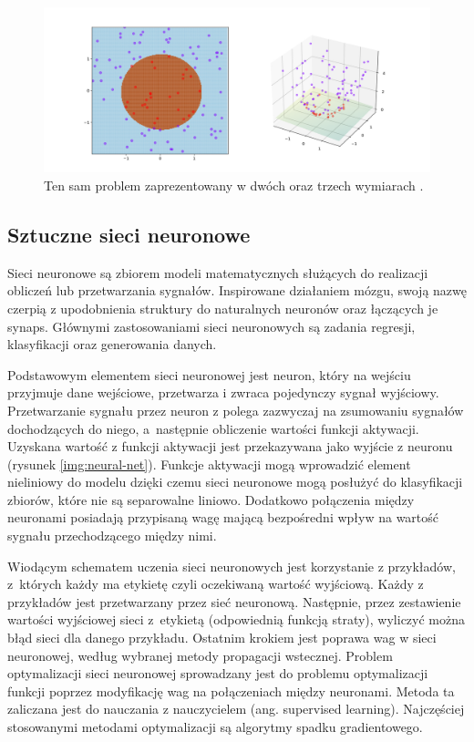 \documentclass[a4paper, twoside, 11pt, openright]{article}
\begin{document}
\begin{figure}[H]
\centering \includegraphics[scale=0.2]{img/svm2.png}
\caption{Ten sam problem zaprezentowany w dwóch oraz trzech wymiarach \cite{wikisvm}.}
\label{img:wiki_svm2}
\end{figure}


\subsection{Sztuczne sieci neuronowe}

Sieci neuronowe \cite{neural-nets} są zbiorem modeli matematycznych służących do realizacji obliczeń lub przetwarzania sygnałów. Inspirowane działaniem mózgu, swoją nazwę czerpią z upodobnienia struktury do naturalnych neuronów oraz łączących je synaps. Głównymi zastosowaniami sieci neuronowych są zadania regresji, klasyfikacji oraz generowania danych. 

\bigskip

Podstawowym elementem sieci neuronowej jest neuron, który na wejściu przyjmuje dane wejściowe, przetwarza i zwraca pojedynczy sygnał wyjściowy. Przetwarzanie sygnału przez neuron z polega zazwyczaj na zsumowaniu sygnałów dochodzących do niego, a~następnie obliczenie wartości funkcji aktywacji. Uzyskana wartość z funkcji aktywacji jest przekazywana jako wyjście z neuronu (rysunek \ref{img:neural-net}). Funkcje aktywacji mogą wprowadzić element nieliniowy do modelu dzięki czemu sieci neuronowe mogą posłużyć do klasyfikacji zbiorów, które nie są separowalne liniowo. Dodatkowo połączenia między neuronami posiadają przypisaną wagę mającą bezpośredni wpływ na wartość sygnału przechodzącego między nimi.

\bigskip

Wiodącym schematem uczenia sieci neuronowych jest korzystanie z przykładów, z~których każdy ma etykietę czyli oczekiwaną wartość wyjściową. Każdy z przykładów jest przetwarzany przez sieć neuronową. Następnie, przez zestawienie wartości wyjściowej sieci z~etykietą (odpowiednią funkcją straty), wyliczyć można błąd sieci dla danego przykładu. Ostatnim krokiem jest poprawa wag w sieci neuronowej, według wybranej metody propagacji wstecznej. Problem optymalizacji sieci neuronowej sprowadzany jest do problemu optymalizacji funkcji poprzez modyfikację wag na połączeniach między neuronami. Metoda ta zaliczana jest do nauczania z nauczycielem (ang. supervised learning). Najczęściej stosowanymi metodami optymalizacji są algorytmy spadku gradientowego. 
\end{document}
